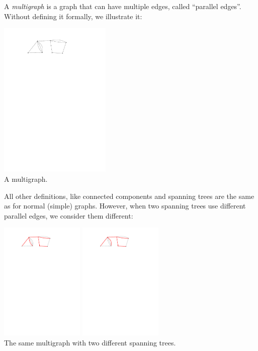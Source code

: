     A \textit{multigraph} is a graph that can have multiple edges, called ``parallel edges''. Without defining it formally, we illustrate it:
    \begin{center}
        \includegraphics[width=0.4\textwidth]{T4/figures/multigraph.pdf}\\
        A multigraph.
    \end{center}
    All other definitions, like connected components and spanning trees are the same as for normal (simple) graphs. However, when two spanning trees use different parallel edges, we consider them different:
    \begin{center}
        \includegraphics[width=0.3\textwidth]{T4/figures/multigraph-forest.pdf} \hspace{2cm}
        \includegraphics[width=0.3\textwidth]{T4/figures/multigraph-forest-other.pdf} \\
        The same multigraph with two different spanning trees.
    \end{center}
    
